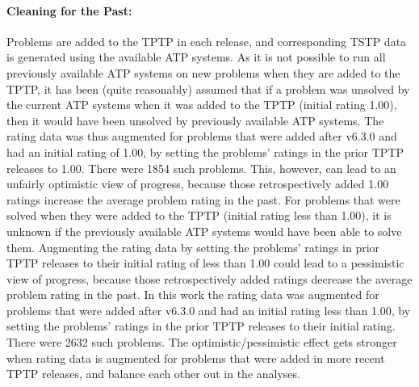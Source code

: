 \documentclass[runningheads]{llncs}
\begin{document}
\paragraph{Cleaning for the Past:}
Problems are added to the TPTP in each release, and corresponding TSTP data is generated using 
the available ATP systems.
As it is not possible to run all previously available ATP systems on new problems when they 
are added to the TPTP, it has been (quite reasonably) assumed that if a problem was unsolved by the 
current ATP systems when it was added to the TPTP (initial rating 1.00), then it would have been 
unsolved by previously available ATP systems.
The rating data was thus augmented for problems that were added after v6.3.0 and had an
initial rating of 1.00, by setting the problems' ratings in the prior TPTP releases to 1.00.
There were 1854 such problems.
This, however, can lead to an unfairly optimistic view of progress, because those retrospectively 
added 1.00 ratings increase the average problem rating in the past.
For problems that were solved when they were added to the TPTP (initial rating less than 1.00),
it is unknown if the previously available ATP systems would have been able to solve them.
Augmenting the rating data by setting the problems' ratings in prior TPTP releases to their 
initial rating of less than 1.00 could lead to a pessimistic view of progress, because those 
retrospectively added ratings decrease the average problem rating in the past.
In this work the rating data was augmented for problems that were added after v6.3.0 and 
had an initial rating less than 1.00, by setting the problems' ratings in the prior TPTP releases 
to their initial rating.
There were 2632 such problems.
The optimistic/pessimistic effect gets stronger when rating data is augmented for problems that
were added in more recent TPTP releases, and balance each other out in the analyses.

\vspace*{-0.5em}
\end{document}
